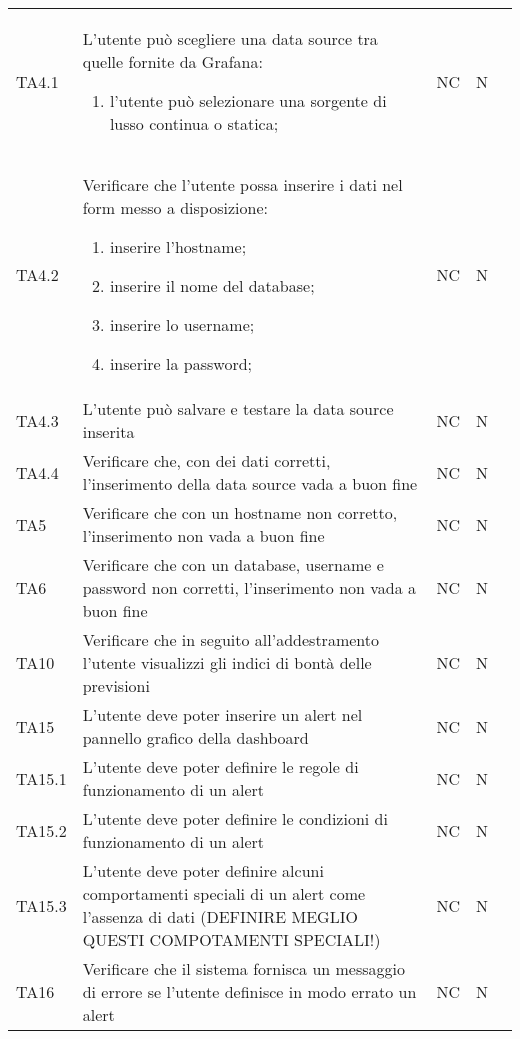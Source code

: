 \begin{longtable} {
		>{\centering}p{15mm} 
		>{\centering}p{79.5mm}
		>{\centering}p{15mm} 
		>{\centering}p{15mm}
		>{}p{0mm}}
	TA4.1 & L'utente può scegliere una data source tra quelle fornite da Grafana:
			\begin{enumerate}
				\item l'utente può selezionare una sorgente di lusso continua o statica;
			\end{enumerate} & NC & N  &\TBstrut \\ [2mm]
	TA4.2 & Verificare che l'utente possa inserire i dati nel form messo a disposizione:
			\begin{enumerate}
				\item inserire l'hostname;
				\item inserire il nome del database;
				\item inserire lo username;
				\item inserire la password;
			\end{enumerate} & NC & N  &\TBstrut \\ [2mm]
	TA4.3 & L'utente può salvare e testare la data source inserita & NC & N  &\TBstrut \\ [2mm]
	TA4.4 & Verificare che, con dei dati corretti, l'inserimento della data source vada a buon fine & NC & N  &\TBstrut \\ [2mm]
	TA5 & Verificare che con un hostname non corretto, l'inserimento non vada a buon fine & NC & N  &\TBstrut \\ [2mm]
	TA6 & Verificare che con un database, username e password non corretti, l'inserimento non vada a buon fine & NC & N  &\TBstrut \\ [2mm]
	TA10 & Verificare che in seguito all'addestramento l'utente visualizzi gli indici di bontà delle previsioni  & NC & N  &\TBstrut \\ [2mm]
	TA15 & L'utente deve poter inserire un alert nel pannello grafico della dashboard & NC & N  &\TBstrut \\ [2mm]
	TA15.1 & L'utente deve poter definire le regole di funzionamento di un alert & NC & N  &\TBstrut \\ [2mm]
	TA15.2 & L'utente deve poter definire le condizioni di funzionamento di un alert & NC & N  &\TBstrut \\ [2mm]
	TA15.3 & L'utente deve poter definire alcuni comportamenti speciali di un alert come l'assenza di dati (DEFINIRE MEGLIO QUESTI COMPOTAMENTI SPECIALI!) & NC & N  &\TBstrut \\ [2mm]
	TA16 & Verificare che il sistema fornisca un messaggio di errore se l'utente definisce in modo errato un alert & NC & N  &\TBstrut \\ [2mm]

\end{longtable}
